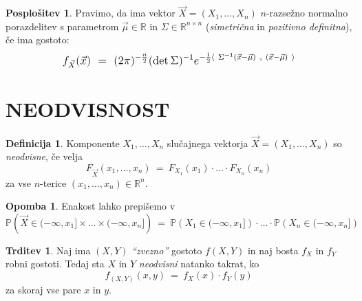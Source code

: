 \documentclass[11pt]{article}
\newcommand{\1}{\mathbbm{1}}
\theoremstyle{definition}
\newtheorem{definicija}{Definicija}[section]
\theoremstyle{definition}
\newtheorem{trditev}{Trditev}[section]
\theoremstyle{definition}
\newtheorem*{opomba}{Opomba}
\newtheorem*{posplošitev}{Posplošitev}
\begin{document}
\begin{posplošitev}

Pravimo, da ima vektor $\vec{X} = (X_1, \ldots, X_n)$ $n$-razsežno normalno porazdelitev s parametrom $\vec{\mu} \in \mathbb{R}$ in $\Sigma \in \mathbb{R}^{n \times n}$ (\textit{simetrična} in \textit{pozitivno definitna}), če ima gostoto:
$$\mathlarger{f_{\vec{X}}(\vec{x}) ~=~ (2\pi)^{-\frac{n}{2}} (\det{\Sigma})^{-1} e^{-\frac{1}{2} \langle~ \Sigma^{-1}(\vec{x} - \vec{\mu})~, ~(\vec{x} - \vec{\mu}) ~\rangle}}$$ 

\end{posplošitev}
\vspace{0.5cm}

\pagebreak


\section{NEODVISNOST}
\vspace{0.5cm}

\begin{definicija}

Komponente $X_1, \ldots, X_n$ slučajnega vektorja $\vec{X} = (X_1, \ldots, X_n)$ so \textit{neodvisne}, če velja
$$F_{\vec{X}}(x_1, \ldots, x_n) ~=~ F_{X_1}(x_1) \cdot \ldots \cdot F_{X_n}(x_n)$$
za vse $n$-terice $(x_1, \ldots, x_n) \in \mathbb{R}^n$.

\end{definicija}
\vspace{0.5cm}

\begin{opomba}

Enakost lahko prepišemo v 
$$\mathbb{P} \left( \vec{X} \in (-\infty, x_1] \times \ldots \times (-\infty, x_n] \right) ~=~ \mathbb{P} \left( X_1 \in (-\infty, x_1] \right) \cdot \ldots \cdot \mathbb{P} \left( X_n \in (-\infty, x_n] \right)$$

\end{opomba}
\vspace{0.5cm}

\begin{trditev}

Naj ima $(X, Y)$ \textit{``zvezno''} gostoto $f(X, Y)$ in naj bosta $f_X$ in $f_Y$ robni gostoti. Tedaj sta $X$ in $Y$ \textit{neodvisni} natanko takrat, ko 
$$f_{(X, Y)}(x, y) ~=~ f_X(x) \cdot f_Y(y)$$
za skoraj vse pare $x$ in $y$.

\end{trditev}
\vspace{0.5cm}
\end{document}
